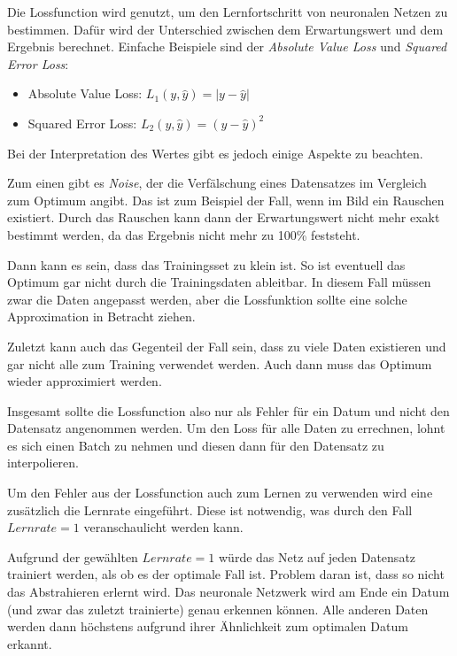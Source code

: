 Die Lossfunction wird genutzt, um den Lernfortschritt von neuronalen Netzen zu bestimmen.
Dafür wird der Unterschied zwischen dem Erwartungswert und dem Ergebnis berechnet.
Einfache Beispiele sind der \textit{Absolute Value Loss} und \textit{Squared Error Loss}:
\begin{itemize}
	\item Absolute Value Loss: $L_1(y, \hat{y}) = |y - \hat{y}|$
	\item Squared Error Loss: $L_2(y, \hat{y}) = (y - \hat{y})^2$
\end{itemize}

Bei der Interpretation des Wertes gibt es jedoch einige Aspekte zu beachten.

Zum einen gibt es \textit{Noise}, der die Verfälschung eines Datensatzes im Vergleich zum Optimum angibt.
Das ist zum Beispiel der Fall, wenn im Bild ein Rauschen existiert.
Durch das Rauschen kann dann der Erwartungswert nicht mehr exakt bestimmt werden, da das Ergebnis nicht mehr zu 100\% feststeht.

Dann kann es sein, dass das Trainingsset zu klein ist.
So ist eventuell das Optimum gar nicht durch die Trainingsdaten ableitbar.
In diesem Fall müssen zwar die Daten angepasst werden, aber die Lossfunktion sollte eine solche Approximation in Betracht  ziehen. 

Zuletzt kann auch das Gegenteil der Fall sein, dass zu viele Daten existieren und gar nicht alle zum Training verwendet werden.
Auch dann muss das Optimum wieder approximiert werden.

Insgesamt sollte die Lossfunction also nur als Fehler für ein Datum und nicht den Datensatz angenommen werden.
Um den Loss für alle Daten zu errechnen, lohnt es sich einen Batch zu nehmen und diesen dann für den Datensatz zu interpolieren.

Um den Fehler aus der Lossfunction auch zum Lernen zu verwenden wird eine zusätzlich die Lernrate eingeführt.
Diese ist notwendig, was durch den Fall $Lernrate = 1$ veranschaulicht werden kann.

Aufgrund der gewählten $Lernrate = 1$ würde das Netz auf jeden Datensatz trainiert werden, als ob es der optimale Fall ist.
Problem daran ist, dass so nicht das Abstrahieren erlernt wird.
Das neuronale Netzwerk wird am Ende ein Datum (und zwar das zuletzt trainierte) genau erkennen können.
Alle anderen Daten werden dann höchstens aufgrund ihrer Ähnlichkeit zum optimalen Datum erkannt.
\newline

